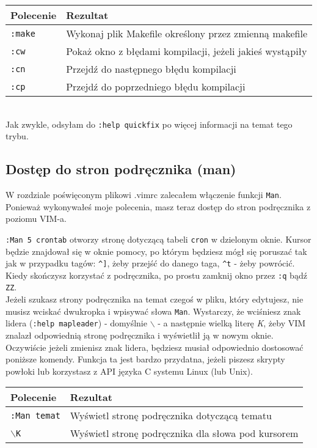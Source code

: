 \documentclass[a4paper,12pt]{article}
\begin{document}
\begin{tabular}{ l | p{} }
{\bf Polecenie} & {\bf Rezultat} \\ \hline
{\tt :make} & Wykonaj plik Makefile określony przez zmienną makefile \\
{\tt :cw} & Pokaż okno z błędami kompilacji, jeżeli jakieś wystąpiły \\
{\tt :cn} & Przejdź do następnego błędu kompilacji \\
{\tt :cp} & Przejdź do poprzedniego błędu kompilacji \\ \hline
\end{tabular}\\

\noindent
Jak zwykle, odsyłam do {\tt :help quickfix} po więcej informacji na temat tego trybu.
\subsection{Dostęp do stron podręcznika (man)}
W rozdziale poświęconym plikowi .vimrc zalecałem włączenie funkcji {\tt Man}. Ponieważ wykonywałeś moje polecenia, masz teraz dostęp do stron podręcznika z poziomu VIM-a.

{\tt :Man 5 crontab} otworzy stronę dotyczącą tabeli {\tt cron} w dzielonym oknie. Kursor będzie znajdował się w oknie pomocy, po którym będziesz mógł się poruszać tak jak w przypadku tagów: {\tt \^{}]}, żeby przejść do danego taga, {\tt \^{}t} - żeby powrócić. Kiedy skończysz korzystać z podręcznika, po prostu zamknij okno przez {\tt :q} bądź {\tt ZZ}.\\
Jeżeli szukasz strony podręcznika na temat czegoś w pliku, który edytujesz, nie musisz wciskać dwukropka i wpisywać słowa {\tt Man}. Wystarczy, że wciśniesz znak lidera ({\tt :help mapleader}) - domyślnie {\tt $\backslash$} - a następnie wielką literę {\it K}, żeby VIM znalazł odpowiednią stronę podręcznika i wyświetlił ją w nowym oknie. Oczywiście jeżeli zmienisz znak lidera, będziesz musiał odpowiednio dostosować poniższe komendy. Funkcja ta jest bardzo przydatna, jeżeli piszesz skrypty powłoki lub korzystasz z API języka C systemu Linux (lub Unix).\\

\begin{tabular}{ l | p{} }
{\bf Polecenie} & {\bf Rezultat} \\ \hline
{\tt :Man temat} & Wyświetl stronę podręcznika dotyczącą tematu \\
{\tt $\backslash$K} & Wyświetl stronę podręcznika dla słowa pod kursorem \\ \hline
\end{tabular}\\
\end{document}
